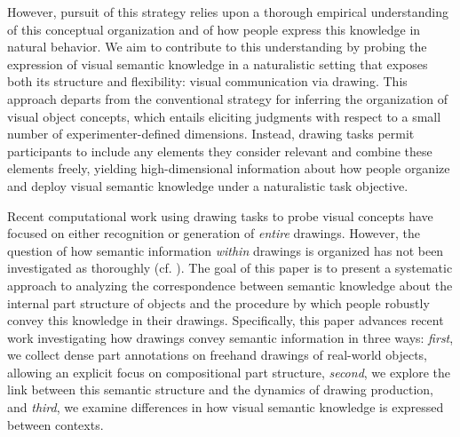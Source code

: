 \documentclass[10pt,letterpaper]{article}
\begin{document}
However, pursuit of this strategy relies upon a thorough empirical understanding of this conceptual organization and of how people express this knowledge in natural behavior. 
We aim to contribute to this understanding by probing the expression of visual semantic knowledge in a naturalistic setting that exposes both its structure and flexibility: visual communication via drawing. 
This approach departs from the conventional strategy for inferring the organization of visual object concepts, which entails eliciting judgments with respect to a small number of experimenter-defined dimensions. 
Instead, drawing tasks permit participants to include any elements they consider relevant and combine these elements freely, yielding high-dimensional information about how people organize and deploy visual semantic knowledge under a naturalistic task objective. 

Recent computational work using drawing tasks to probe visual concepts have focused on either recognition \cite{eitz2012humans,yu2017sketch} or generation \cite{ha2017neural,li2019photo} of \textit{entire} drawings. 
However, the question of how semantic information \textit{within} drawings is organized has not been investigated as thoroughly (cf. ).
The goal of this paper is to present a systematic approach to analyzing the correspondence between semantic knowledge about the internal part structure of objects and the procedure by which people robustly convey this knowledge in their drawings. 
Specifically, this paper advances recent work investigating how drawings convey semantic information in three ways: 
\textit{first}, we collect dense part annotations on freehand drawings of real-world objects, allowing an explicit focus on compositional part structure,
\textit{second}, we explore the link between this semantic structure and the dynamics of drawing production,
and \textit{third}, we examine differences in how visual semantic knowledge is expressed between contexts. 

\end{document}
